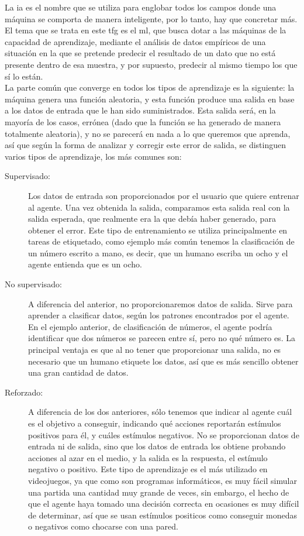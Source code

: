 La \gls{ia} es el nombre que se utiliza para englobar todos los campos donde una máquina se comporta de manera inteligente, por lo tanto, hay que concretar más. El tema que se trata en este \gls{tfg} es el \gls{ml}, que busca dotar a las máquinas de la capacidad de aprendizaje, mediante el análisis de datos empíricos de una situación en la que se pretende predecir el resultado de un dato que no está presente dentro de esa muestra, y por supuesto, predecir al mismo tiempo los que sí lo están. 
\\
La parte común que converge en todos los tipos de aprendizaje es la siguiente: la máquina genera una función aleatoria, y esta función produce una salida en base a los datos de entrada que le han sido suministrados. Esta salida será, en la mayoría de los casos, errónea (dado que la función se ha generado de manera totalmente aleatoria), y no se parecerá en nada a lo que queremos que aprenda, así que según la forma de analizar y corregir este error de salida, se distinguen varios tipos de aprendizaje, los más comunes son:
\begin{description}
	\item[Supervisado:]  Los datos de entrada son proporcionados por el usuario que quiere entrenar al agente. Una vez obtenida la salida, comparamos esta salida real con la salida esperada, que realmente era la que debía haber generado, para obtener el error. Este tipo de entrenamiento se utiliza principalmente en tareas de etiquetado, como ejemplo más común tenemos la clasificación de un número escrito a mano, es decir, que un humano escriba un ocho y el agente entienda que es un ocho.
	\item[No supervisado:] A diferencia del anterior, no proporcionaremos datos de salida. Sirve para aprender a clasificar datos, según los patrones encontrados por el agente. En el ejemplo anterior, de clasificación de números, el agente podría identificar que dos números se parecen entre sí, pero no qué número es. La principal ventaja es que al no tener que proporcionar una salida, no es necesario que un humano etiquete los datos, así que es más sencillo obtener una gran cantidad de datos.
	\item[Reforzado:] A diferencia de los dos anteriores, sólo tenemos que indicar al agente cuál es el objetivo a conseguir, indicando qué acciones reportarán estímulos positivos para él, y cuáles estímulos negativos. No se proporcionan datos de entrada ni de salida, sino que los datos de entrada los obtiene probando acciones al azar en el medio, y la salida es la respuesta, el estímulo negativo o positivo.  Este tipo de aprendizaje es el más utilizado en videojuegos, ya que como son programas informáticos, es muy fácil simular una partida una cantidad muy grande de veces, sin embargo, el hecho de que el agente haya tomado una decisión correcta en ocasiones es muy difícil de determinar, así que se usan estímulos positicos como conseguir monedas o negativos como chocarse con una pared.
\end{description}

